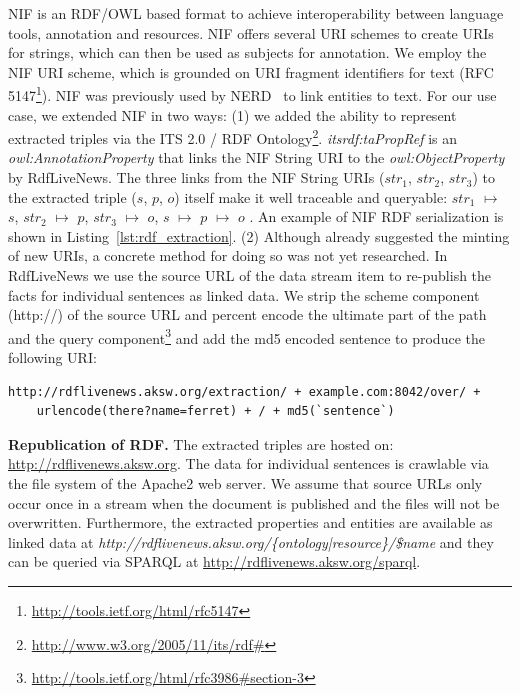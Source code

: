 \documentclass[a4paper]{llncs}
\newcommand{\NAME}{RdfLiveNews}
\begin{document}
NIF is an RDF/OWL based format to achieve interoperability between language tools, annotation and resources. NIF offers several URI schemes to create URIs for strings, which can then be used as subjects for annotation. We employ the NIF URI scheme, which is grounded on URI fragment identifiers for text (RFC 5147\footnote{\url{http://tools.ietf.org/html/rfc5147}}). 
NIF was previously used by NERD~\cite{EURECOM+3675} to link entities to text.  
For our use case, we extended NIF in two ways: 
(1) we added the ability to represent extracted triples via the ITS 2.0 / RDF Ontology\footnote{\url{http://www.w3.org/2005/11/its/rdf#}}. 
\emph{itsrdf:taPropRef} is an \emph{owl:AnnotationProperty} that links the NIF String URI to the \emph{owl:ObjectProperty} by \NAME. 
The three links from the NIF String URIs ($str_1$, $str_2$, $str_3$) to the extracted triple ($s$, $p$, $o$) itself make it well traceable and queryable: 
$str_1$ $\mapsto$ $s$, $str_2$  $\mapsto$  $p$, $str_3$  $\mapsto$  $o$,  $s$  $\mapsto$  $p$ $\mapsto$ $o$ .
An example of NIF RDF serialization is shown in Listing~\ref{lst:rdf_extraction}.
(2) Although \cite{EURECOM+3675} already suggested the minting of new URIs, a concrete method for doing so was not yet researched. 
In \NAME{} we use the source URL of the data stream item to re-publish the facts for individual sentences as linked data. 
We strip the scheme component (http://) of the source URL and percent encode the ultimate part of the path and the query component\footnote{\url{http://tools.ietf.org/html/rfc3986#section-3}} and add the md5 encoded sentence to produce the following URI:
{\small \begin{verbatim}
http://rdflivenews.aksw.org/extraction/ + example.com:8042/over/ +
    urlencode(there?name=ferret) + / + md5(`sentence`)
\end{verbatim}}


\textbf{Republication of RDF.} The extracted triples are hosted on: \url{http://rdflivenews.aksw.org}. 
The data for individual sentences is crawlable via the file system of the Apache2 web server. 
We assume that source URLs only occur once in a stream when the document is published and the files will not be overwritten. 
Furthermore, the extracted properties and entities are available as linked data at \emph{http://rdflivenews.aksw.org/\{ontology|resource\}/\$name} and they can be queried via SPARQL at \url{http://rdflivenews.aksw.org/sparql}. 
\end{document}
